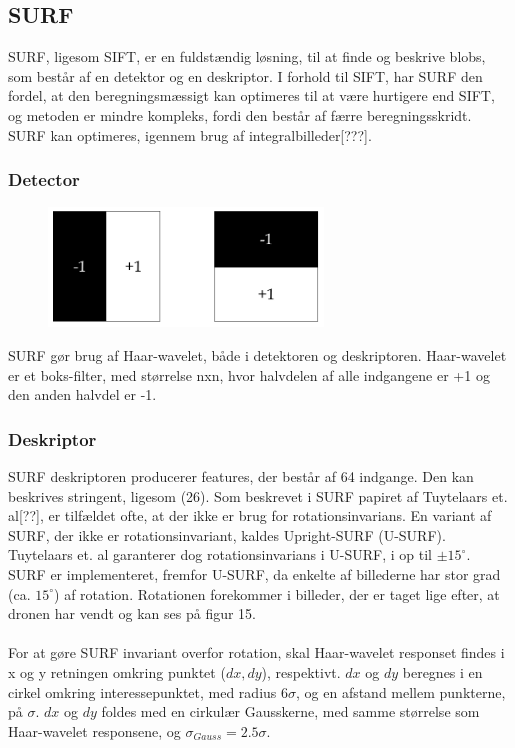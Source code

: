 \subsection{SURF}
SURF, ligesom SIFT, er en fuldstændig løsning, til at finde og beskrive blobs, som består af en detektor og en deskriptor. I forhold til SIFT, har SURF den fordel, at den beregningsmæssigt kan optimeres til at være hurtigere end SIFT, og metoden er mindre kompleks, fordi den består af færre beregningsskridt. SURF kan optimeres, igennem brug af integralbilleder[???].
\subsubsection{Detector}
\begin{figure}[H]
    \centering
    \includegraphics[width=0.65\textwidth]{fig/haarwavelet.png}
     \vspace{-1em}
    \begin{center}    
       \caption{\textcolor{gray}{\footnotesize \textit{ }}}
    \label{fig:haarwavelet}
     \end{center}
     \vspace{-2.5em}
  \end{figure} \noindent

SURF gør brug af Haar-wavelet, både i detektoren og deskriptoren. Haar-wavelet er et boks-filter, med størrelse nxn, hvor halvdelen af alle indgangene er +1 og den anden halvdel er -1.


\subsubsection{Deskriptor}
SURF deskriptoren producerer features, der består af 64 indgange. Den kan beskrives stringent, ligesom (26). Som beskrevet i SURF papiret af Tuytelaars et. al[??], er tilfældet ofte, at der ikke er brug for rotationsinvarians. En variant af SURF, der ikke er rotationsinvariant, kaldes Upright-SURF (U-SURF). Tuytelaars et. al garanterer dog rotationsinvarians i U-SURF, i op til $\pm 15^{\circ}$. SURF er implementeret, fremfor U-SURF, da enkelte af billederne har stor grad (ca. $15^{\circ}$) af rotation. Rotationen forekommer i billeder, der er taget lige efter, at dronen har vendt og kan ses på figur 15.
\\
\\
For at gøre SURF invariant overfor rotation, skal Haar-wavelet responset findes i x og y retningen omkring punktet ($dx, dy$), respektivt. $dx$ og $dy$ beregnes i en cirkel omkring interessepunktet, med radius $6\sigma$, og en afstand mellem punkterne, på $\sigma$. $dx$ og $dy$ foldes med en cirkulær Gausskerne, med samme størrelse som Haar-wavelet responsene, og $\sigma_{Gauss} = 2.5\sigma$.
